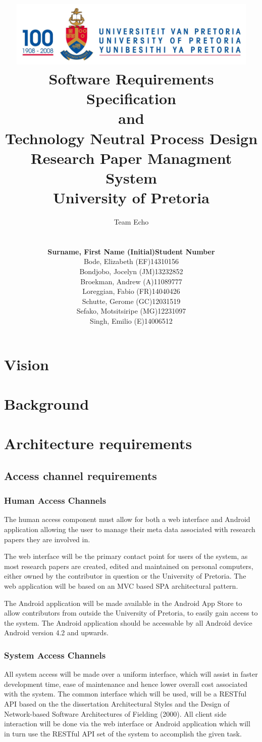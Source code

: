 \documentclass[a4paper,10pt]{article}
\title{\includegraphics[width=12cm]{Eeufeeslogo.jpg} \\
       Software Requirements Specification \\ 
       and \\
       Technology Neutral Process Design \\
       Research Paper Managment System \\
       \vspace{0.5cm}
       University of Pretoria \\
       \vspace{1.0cm}
       }
\date{}
\author{Team Echo\\
	\vspace{0.5cm} \\
	\begin{tabu} to \textwidth { X[l] X[l]}
		\hline
		\textbf{Surname, First Name (Initial)}	& \textbf{Student Number}	\\ \hline \hline
		Bode, Elizabeth (EF)			& 14310156		\\ \hline
		Bondjobo, Jocelyn (JM)		& 13232852		\\ \hline
		Broekman, Andrew (A)		& 11089777		\\ \hline
		Loreggian, Fabio (FR)			& 14040426		\\ \hline
		Schutte, Gerome (GC)		& 12031519		\\ \hline
		Sefako, Motsitsiripe (MG)		& 12231097		\\ \hline
		Singh, Emilio (E)			& 14006512		\\ \hline
		\hline
	\end{tabu}}
\begin{document}
\clearpage
\maketitle
\thispagestyle{empty}

\newpage
{}

\tableofcontents

\newpage
{}

\section{Vision}

\section{Background}

\section{Architecture requirements}
\subsection{Access channel requirements}
\subsubsection{Human Access Channels}
The human access component must allow for both a web interface and Android application allowing the user to manage their meta data associated with research papers they are involved in. 

The web interface will be the primary contact point for users of the system, as most research papers are created, edited and maintained on personal computers, either owned by the contributor in question or the University of Pretoria. The web application will be based on an MVC based SPA architectural pattern. 

The Android application will be made available in the Android App Store to allow contributors from outside the University of Pretoria, to easily gain access to the system. The Android application should be accessable by all Android device Android version 4.2 and upwards.

\subsubsection{System Access Channels}
All system access will be made over a uniform interface, which will assist in faster development time, ease of maintenance and hence lower overall cost associated with the system. The common interface which will be used, will be a RESTful API based on the the dissertation Architectural Styles and
the Design of Network-based Software Architectures of Fielding (2000).  All client side interaction will be done via the web interface or Android application which will in turn use the RESTful API set of the system to accomplish the given task.
\end{document}
